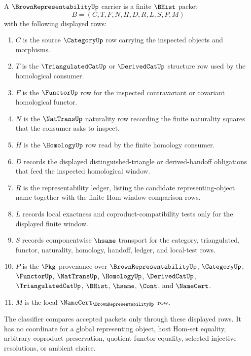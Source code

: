 \begin{definition}
\label{def:brown-representability-carrier}
A $\BrownRepresentabilityUp$ carrier is a finite $\BHist$ packet
$$
B=(C,T,F,N,H,D,R,L,S,P,M)
$$
with the following displayed rows:
\begin{enumerate}
\item $C$ is the source $\CategoryUp$ row carrying the inspected objects and morphisms.
\item $T$ is the $\TriangulatedCatUp$ or $\DerivedCatUp$ structure row used by the homological consumer.
\item $F$ is the $\FunctorUp$ row for the inspected contravariant or covariant homological functor.
\item $N$ is the $\NatTransUp$ naturality row recording the finite naturality squares that the consumer asks to inspect.
\item $H$ is the $\HomologyUp$ row read by the finite homology consumer.
\item $D$ records the displayed distinguished-triangle or derived-handoff obligations that feed the inspected homological window.
\item $R$ is the representability ledger, listing the candidate representing-object name together with the finite Hom-window comparison rows.
\item $L$ records local exactness and coproduct-compatibility tests only for the displayed finite window.
\item $S$ records componentwise $\hsame$ transport for the category, triangulated, functor, naturality, homology, handoff, ledger, and local-test rows.
\item $P$ is the $\Pkg$ provenance over $\BrownRepresentabilityUp$, $\CategoryUp$, $\FunctorUp$, $\NatTransUp$, $\HomologyUp$, $\DerivedCatUp$, $\TriangulatedCatUp$, $\BHist$, $\hsame$, $\Cont$, and $\NameCert$.
\item $M$ is the local $\NameCert_{\BrownRepresentabilityUp}$ row.
\end{enumerate}
The classifier compares accepted packets only through these displayed rows. It has no coordinate for a global representing object, host Hom-set equality, arbitrary coproduct preservation, quotient functor equality, selected injective resolutions, or ambient choice.
\end{definition}

